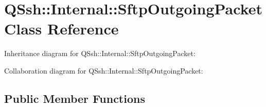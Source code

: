 \hypertarget{class_q_ssh_1_1_internal_1_1_sftp_outgoing_packet}{}\section{Q\+Ssh\+:\+:Internal\+:\+:Sftp\+Outgoing\+Packet Class Reference}
\label{class_q_ssh_1_1_internal_1_1_sftp_outgoing_packet}


Inheritance diagram for Q\+Ssh\+:\+:Internal\+:\+:Sftp\+Outgoing\+Packet\+:


Collaboration diagram for Q\+Ssh\+:\+:Internal\+:\+:Sftp\+Outgoing\+Packet\+:
\subsection*{Public Member Functions}
